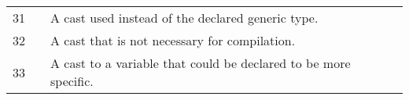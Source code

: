 \begin{table*}[t!]
\begin{tabularx}{\linewidth}{|r|lX|l|}
31 & \nameref{pat:UseRawType}                 & A cast used instead of the declared generic type.                                                                     &                               \\
32 & \nameref{pat:Redundant}                  & A cast that is not necessary for compilation.                                                                         &                               \\
33 & \nameref{pat:VariableLessSpecificType}   & A cast to a variable that could be declared to be more specific.                                                      &                               \\ \hline
\end{tabularx}
\end{table*}